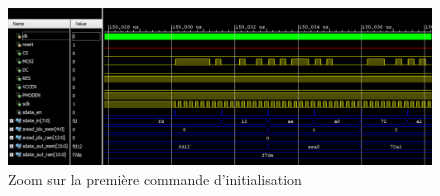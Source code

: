 \documentclass[11pt]{article}
\begin{document}
\begin{figure}[H]
\begin{center}
\includegraphics[scale = 0.3, keepaspectratio]{chrono_3}
\caption{Zoom sur la première commande d'initialisation}
\end{center}
\end{figure}
\end{document}
